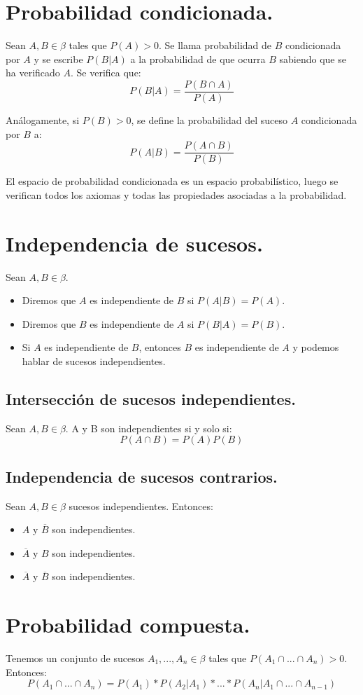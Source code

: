\section{Probabilidad condicionada.}
Sean $A,B \in \beta$ tales que $P(A)>0$. Se llama probabilidad de $B$ condicionada por $A$ y se escribe $P(B|A)$ a la probabilidad de que ocurra $B$ sabiendo que se ha verificado $A$. Se verifica que:
\[P(B|A)=\frac{P(B \cap A)}{P(A)}\]

Análogamente, si $P(B)>0$, se define la probabilidad del suceso $A$ condicionada por $B$ a:
\[P(A|B)=\frac{P(A \cap B)}{P(B)}\]

El espacio de probabilidad condicionada es un espacio probabilístico, luego se verifican todos los axiomas y todas las propiedades asociadas a la probabilidad.

\section{Independencia de sucesos.}
Sean $A,B \in \beta$.
\begin{itemize}
\item Diremos que $A$ es independiente de $B$ si $P(A|B)=P(A)$.
\item Diremos que $B$ es independiente de $A$ si $P(B|A)=P(B)$.
\item Si $A$ es independiente de $B$, entonces $B$ es independiente de $A$ y podemos hablar de sucesos independientes.
\end{itemize}
\subsection{Intersección de sucesos independientes.}
Sean $A,B \in \beta$. A y B son independientes si y solo si:
\[P(A \cap B)=P(A)P(B)\]
\subsection{Independencia de sucesos contrarios.}
Sean $A,B \in \beta$ sucesos independientes. Entonces:
\begin{itemize}
\item $A$ y $\overline{B}$ son independientes.
\item $\overline{A}$ y $B$ son independientes.
\item $\overline{A}$ y $\overline{B}$ son independientes.
\end{itemize}

\section{Probabilidad compuesta.}
Tenemos un conjunto de sucesos $A_{1},...,A_{n} \in \beta$ tales que $P(A_{1} \cap ... \cap A_{n})>0$. Entonces:
\[P(A_{1} \cap ... \cap A_{n}) = P(A_{1})*P(A_{2}|A_{1})*...*P(A_{n}|A_{1} \cap ... \cap A_{n-1})\]

